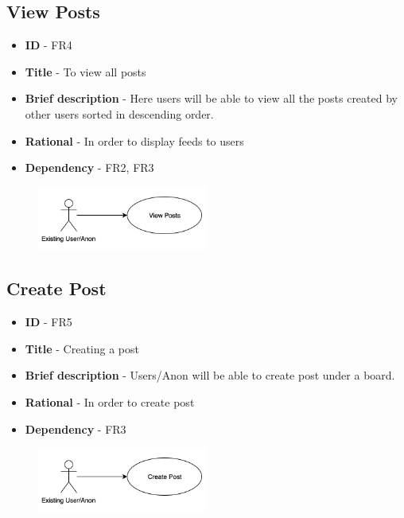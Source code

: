 \documentclass[12pt]{report}
\begin{document}
\subsection{View Posts}
\begin{itemize}
    \item \textbf{ID} - FR4
    \item \textbf{Title} - To view all posts
    \item \textbf{Brief description} - Here users will be able to view all the posts created by other users sorted in descending order.
    \item \textbf{Rational} - In order to display feeds to users
    \item \textbf{Dependency} - FR2, FR3
\end{itemize}
\begin{figure}[h]
\includegraphics[width=0.5\textwidth]{viewpost.png}
\end{figure}

\subsection{Create Post}
\begin{itemize}
    \item \textbf{ID} - FR5
    \item \textbf{Title} - Creating a post
    \item \textbf{Brief description} - Users/Anon will be able to create post under a board.
    \item \textbf{Rational} - In order to create post
    \item \textbf{Dependency} - FR3
\end{itemize}
\begin{figure}[h]
\includegraphics[width=0.5\textwidth]{createpost.png}
\end{figure}
\end{document}
